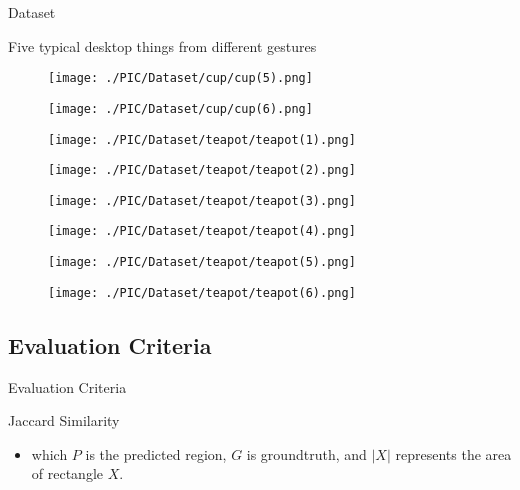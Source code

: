 \documentclass[xcolor=table,compress,blue]{beamer}
\begin{document}
\begin{frame}{Dataset}
\begin{exampleblock}{Five typical desktop things from different gestures}
\begin{figure}[htpb]
\begin{minipage}[b]{0.65in}
			\end{minipage}
			\begin{minipage}[b]{0.65in}
				\centerline{ \texttt{[image: ./PIC/Dataset/cup/cup(5).png]} }
			\end{minipage}
			\begin{minipage}[b]{0.65in}
				\centerline{ \texttt{[image: ./PIC/Dataset/cup/cup(6).png]} }
			\end{minipage}
			\begin{minipage}[b]{0.65in}
				\centerline{ \texttt{[image: ./PIC/Dataset/teapot/teapot(1).png]} }
			\end{minipage}
			\begin{minipage}[b]{0.65in}
				\centerline{ \texttt{[image: ./PIC/Dataset/teapot/teapot(2).png]} }
			\end{minipage}
			\begin{minipage}[b]{0.65in}
				\centerline{ \texttt{[image: ./PIC/Dataset/teapot/teapot(3).png]} }
			\end{minipage}
			\begin{minipage}[b]{0.65in}
				\centerline{ \texttt{[image: ./PIC/Dataset/teapot/teapot(4).png]} }
			\end{minipage}
			\begin{minipage}[b]{0.65in}
				\centerline{ \texttt{[image: ./PIC/Dataset/teapot/teapot(5).png]} }
			\end{minipage}
			\begin{minipage}[b]{0.65in}
				\centerline{ \texttt{[image: ./PIC/Dataset/teapot/teapot(6).png]} }
			\end{minipage}
			
		\end{figure}
	\end{exampleblock}
\end{frame}


\subsection{Evaluation Criteria}
\begin{frame}{Evaluation Criteria}
	\begin{exampleblock}{Jaccard Similarity}
		\begin{itemize}
			\item \large{which $P$ is the predicted region, 
				$G$ is groundtruth, and $|X|$ represents the area of rectangle $X$.}
		\end{itemize}
	\end{exampleblock}
\end{frame}
\end{document}
